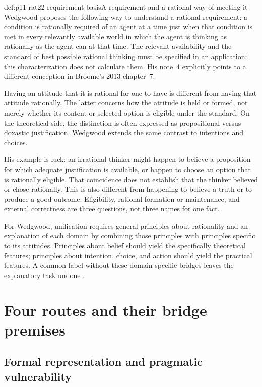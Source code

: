 \begin{hbdefinition}{def:p11-rat22-requirement-basis}{A requirement and a rational way of meeting it}
Wedgwood proposes the following way to understand a rational requirement:
a condition is rationally required of an agent at a time just when that
condition is met in every relevantly available world in which the agent
is thinking as rationally as the agent can at that time.
The relevant availability and the standard of best possible rational
thinking must be specified in an application; this characterization does
not calculate them. His note~4 explicitly points to a different conception
in Broome's 2013 chapter~7.

Having an attitude that it is rational for one to have is different from
having that attitude rationally. The latter concerns how the attitude is
held or formed, not merely whether its content or selected option is
eligible under the standard. On the theoretical side, the distinction is
often expressed as propositional versus doxastic justification. Wedgwood
extends the same contrast to intentions and choices.
\end{hbdefinition}

His example is luck: an irrational thinker might happen to believe a
proposition for which adequate justification is available, or happen to
choose an option that is rationally eligible. That coincidence does not
establish that the thinker believed or chose rationally. This is also
different from happening to believe a truth or to produce a good outcome.
Eligibility, rational formation or maintenance, and external correctness
are three questions, not three names for one fact.

For Wedgwood, unification requires general principles about rationality
and an explanation of each domain by combining those principles with
principles specific to its attitudes. Principles about belief should
yield the specifically theoretical features; principles about intention,
choice, and action should yield the practical features. A common label
without these domain-specific bridges leaves the explanatory task undone
\parencite[p.~140 and p.~144, n.~4]{RalphWedgwood2021}.

\section{Four routes and their bridge premises}
\label{sec:p11-rat22-four-routes}

\subsection{Formal representation and pragmatic vulnerability}

